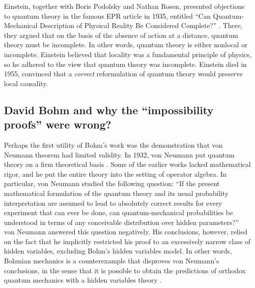 \documentclass[onecolumn,nofootinbib, secnumarabic, amsmath, nobibnotes,11pt,aps,pra]{revtex4-1}
\begin{document}
Einstein, together with Boris Podolsky and Nathan Rosen, presented
objections to quantum theory in the famous EPR article in 1935,
entitled ``Can Quantum-Mechanical Description of Physical Reality Be
Considered Complete?'' \cite{om.Einstein_rosen1935}. There, they
argued that on the basis of the absence of action at a distance,
quantum theory must be incomplete. In other words, quantum theory is
either nonlocal or incomplete. Einstein believed that locality was a
fundamental principle of physics, so he adhered to the view that
quantum theory was incomplete. Einstein died in 1955, convinced that
a \textit{correct} reformulation of quantum theory would preserve
local causality.


\subsection{David Bohm and why the ``impossibility proofs'' were wrong?}\label{om.sec_intro.7}

Perhaps the first utility of Bohm's work was the demonstration that von Neumann theorem had limited validity. In 1932, von Neumann put quantum theory on a firm theoretical basis \cite{om.impossibility_proofs}. Some of the earlier works lacked mathematical rigor, and he put the entire theory into the setting of operator algebra. In particular,  von Neumann studied the following question: ``If the present mathematical formulation of the quantum theory and its usual probability interpretation are assumed to lead to absolutely correct results for every experiment that can ever be done, can quantum-mechanical probabilities be understood in terms of any conceivable distribution over hidden parameters?'' von Neumann answered this question negatively.
His conclusions, however, relied on the fact that he implicitly restricted his proof to an excessively narrow class of hidden variables, excluding Bohm's hidden variables model.
In other words, Bohmian mechanics is a counterexample that disproves von Neumann's conclusions, in the sense that it is possible to obtain the predictions of orthodox quantum mechanics with a hidden variables theory \cite{om.Holand1993,om.Bell1987}.
\end{document}
